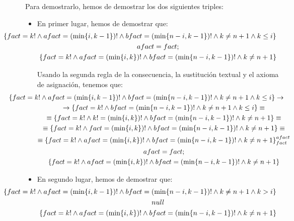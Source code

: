 \begin{ejercicio}
\begin{itemize}
        Para demostrarlo, hemos de demostrar los dos siguientes triples:
        \begin{itemize}
            \item En primer lugar, hemos de demostrar que:
            \begin{gather*}
                \hspace{-1.8cm}\left\{fact = k! \land afact = (\min\{i,k-1\})! \land bfact = (\min\{n-i,k-1\})! \land k \neq n+1 \land k \leq i\right\} \\
                afact = fact; \\
                \left\{fact = k! \land afact = (\min\{i,k\})! \land bfact = (\min\{n-i,k-1\})! \land k \neq n+1\right\}
            \end{gather*}

            Usando la segunda regla de la consecuencia, la sustitución textual y el axioma de asignación, tenemos que:
            \begin{gather*}
                \hspace{-1.8cm}\left\{fact = k! \land afact = (\min\{i,k-1\})! \land bfact = (\min\{n-i,k-1\})! \land k \neq n+1 \land k \leq i\right\} \rightarrow \\
                \rightarrow\left\{fact = k! \land bfact = (\min\{n-i,k-1\})! \land k \neq n+1 \land k\leq i\right\}\equiv \\
                \equiv\left\{fact = k! \land k! = (\min\{i,k\})! \land bfact = (\min\{n-i,k-1\})! \land k \neq n+1\right\}\equiv \\
                \equiv\left\{fact = k! \land fact = (\min\{i,k\})! \land bfact = (\min\{n-i,k-1\})! \land k \neq n+1\right\}\equiv \\
                \equiv \left\{fact = k! \land afact = (\min\{i,k\})! \land bfact = (\min\{n-i,k-1\})! \land k \neq n+1\right\}_{{fact}}^{{afact}} \\
                afact = fact; \\
                \left\{fact = k! \land afact = (\min\{i,k\})! \land bfact = (\min\{n-i,k-1\})! \land k \neq n+1\right\}
            \end{gather*}

            \item En segundo lugar, hemos de demostrar que:
            \begin{gather*}
                \hspace{-1.8cm}\left\{fact = k! \land afact = (\min\{i,k-1\})! \land bfact = (\min\{n-i,k-1\})! \land k \neq n+1 \land k > i\right\} \\
                null \\
                \left\{fact = k! \land afact = (\min\{i,k\})! \land bfact = (\min\{n-i,k-1\})! \land k \neq n+1\right\}
            \end{gather*}


\end{itemize}
\end{itemize}
\end{ejercicio}
